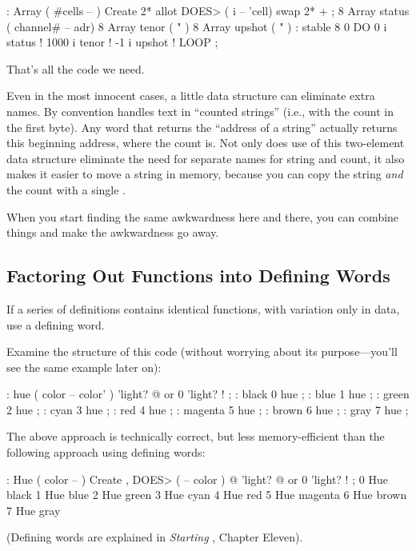 \begin{Code}
: Array  ( #cells -- )  Create  2* allot
   DOES> ( i -- 'cell)  swap  2* + ; 
8 Array status  ( channel# -- adr)
8 Array tenor   (        "       )
8 Array upshot  (        "       )
: stable   8 0 DO  0 i status !  1000 i tenor ! 
   -1 i upshot !  LOOP ;
\end{Code}
That's all the code we need.

Even in the most innocent cases, a little data structure can eliminate
extra names. By convention \Forth{} handles text in ``counted
strings'' (i.e., with the count in the first byte). Any word that
returns the ``address of a string'' actually returns this beginning
address, where the count is. Not only does use of this two-element
data structure eliminate the need for separate names for string and
count, it also makes it easier to move a string in memory, because you
can copy the string \emph{and} the count with a single .

When you start finding the same awkwardness here and there, you can
combine things and make the awkwardness go away.
%

\subsection{Factoring Out Functions into Defining Words}

\begin{tip}
If a series of definitions contains identical functions, with
variation only in data, use a defining word.
\end{tip}
Examine the structure of this code (without worrying about its
purpose---you'll see the same example later on):

\begin{Code}
: hue  ( color -- color' ) 
   'light? @  or  0 'light? ! ;
: black   0 hue ;
: blue   1 hue ;
: green   2 hue ;
: cyan   3 hue ;
: red   4 hue ;
: magenta   5 hue ;
: brown   6 hue ;
: gray   7 hue ;
\end{Code}

\noindent The above approach is technically correct, but less
memory-efficient than the following approach using defining words:

\begin{Code}
: Hue   ( color -- )  Create ,
   DOES>  ( -- color )  @ 'light? @  or  0 'light? ! ;
 0 Hue black         1 Hue blue          2 Hue green
 3 Hue cyan          4 Hue red           5 Hue magenta
 6 Hue brown         7 Hue gray
\end{Code}
(Defining words are explained in \emph{Starting \Forth{}}, Chapter Eleven).

